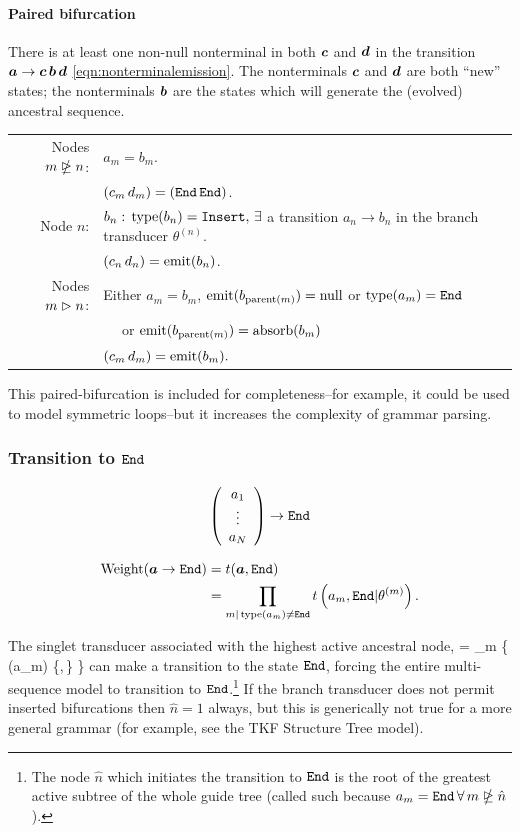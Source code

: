 \documentclass[10pt]{article}
\begin{document}
\paragraph{Paired bifurcation}
There is at least one non-null nonterminal in both $\bvec{c}$ and $\bvec{d}$ in the transition $\bvec{a} \to \bvec{c}\,\bvec{b}\,\bvec{d}$ \eqref{eqn:nonterminalemission}.
The nonterminals $\bvec{c}$ and $\bvec{d}$ are both ``new'' states;
the nonterminals $\bvec{b}$ are the states which will generate the (evolved) ancestral sequence.

\begin{tabular}{rl}
  Nodes $\mNDEn$: & $a_m = b_m$. \\
  & $(c_m\,d_m) = (\Send\,\Send)$. \\
  Node $n$: & $b_n:\,\type(b_n) = \Sinsert,\,\exists$ a transition $a_n \to b_n$ in the branch transducer $\theta^{(n)}$. \\
  & $(c_n\,d_n) = \emit(b_n)$. \\
  Nodes $\mDn$: & Either $a_m = b_m$, $\emit(b_{\parent(m)}) = \Tnull$ or $\type(a_m) = \Send$ \\
  & $\quad$ or $\emit(b_{\parent(m)}) = \absorb(b_m)$ \\
  & $(c_m\,d_m) = \emit(b_m) . $
\end{tabular}

This paired-bifurcation is included for completeness--for example, it could be used to model symmetric loops--but it
increases the complexity of grammar parsing.



\subsubsection*{Transition to $\Send$}
\[ \statevec{a} \to \Send \]

\begin{align} \label{eqn:transtoend}
  \weight(\bvec{a}\to\Send) &=  t(\bvec{a},\Send) \\
  &= \prod_{m|\type(a_m)\ne\Send} \transweight{m}{a_m}{\Send} .
\end{align}

The singlet transducer associated with the highest active ancestral node,
\beqn
{} = \argmin_m \left\{ \type(a_m) \in \{\Sstart,\,\Sinsert\} \right\}
\eeqn
can make a transition to the state $\Send$,
forcing the entire multi-sequence model to transition to $\Send$.\footnote{The node $\hat{n}$ which initiates the transition to $\Send$ 
is the root of the greatest active subtree of the whole guide tree (called such because $a_m = \Send \, \forall \, m \ntrianglerighteq \hat{n}$).}
If the branch transducer does not permit inserted bifurcations then $\hat{n} = 1$ always,
but this is generically not true for a more general grammar
(for example, see the TKF Structure Tree model).
\end{document}

